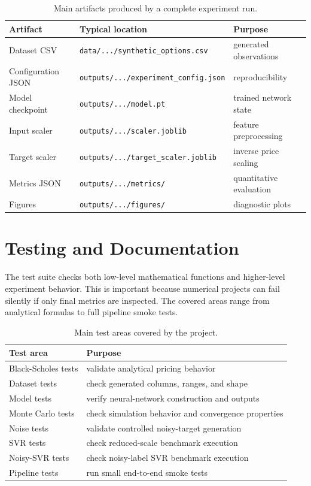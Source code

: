 \begin{table}[H]
    \centering
    \begin{tabular}{lll}
        \toprule
        Artifact & Typical location & Purpose \\
        \midrule
        Dataset CSV & \texttt{data/.../synthetic\_options.csv} & generated observations \\
        Configuration JSON & \texttt{outputs/.../experiment\_config.json} & reproducibility \\
        Model checkpoint & \texttt{outputs/.../model.pt} & trained network state \\
        Input scaler & \texttt{outputs/.../scaler.joblib} & feature preprocessing \\
        Target scaler & \texttt{outputs/.../target\_scaler.joblib} & inverse price scaling \\
        Metrics JSON & \texttt{outputs/.../metrics/} & quantitative evaluation \\
        Figures & \texttt{outputs/.../figures/} & diagnostic plots \\
        \bottomrule
    \end{tabular}
    \caption{Main artifacts produced by a complete experiment run.}
    \label{tab:software-artifacts}
\end{table}

\section{Testing and Documentation}

The test suite checks both low-level mathematical functions and higher-level experiment behavior.
This is important because numerical projects can fail silently if only final metrics are inspected.
The covered areas range from analytical formulas to full pipeline smoke tests.

\begin{table}[H]
    \centering
    \begin{tabular}{ll}
        \toprule
        Test area & Purpose \\
        \midrule
        Black-Scholes tests & validate analytical pricing behavior \\
        Dataset tests & check generated columns, ranges, and shape \\
        Model tests & verify neural-network construction and outputs \\
        Monte Carlo tests & check simulation behavior and convergence properties \\
        Noise tests & validate controlled noisy-target generation \\
        SVR tests & check reduced-scale benchmark execution \\
        Noisy-SVR tests & check noisy-label SVR benchmark execution \\
        Pipeline tests & run small end-to-end smoke tests \\
        \bottomrule
    \end{tabular}
    \caption{Main test areas covered by the project.}
    \label{tab:test-coverage}
\end{table}

